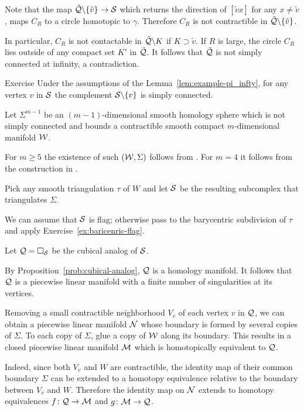 Note that the map $\tilde{\spc{Q}}\backslash \{\tilde v\}\to \spc{S}$
which returns the direction of $[{\tilde v}{x}]$  for any $x\ne \tilde v$, maps $C_R$ to a circle homotopic to $\gamma$.
Therefore $C_R$ is not contractible in $\tilde{\mathcal{Q}}\backslash \{\tilde v\}$.

In particular, 
$C_R$ is not contactable in $\tilde{\mathcal{Q}}\backslash K$
if $K\supset \tilde v$.
If $R$ is large, 
the circle $C_R$  
lies outside of any compact set $K'$ in $\tilde{\mathcal{Q}}$.
It follows that $\tilde{\mathcal{Q}}$ is not simply connected at infinity, a contradiction.
\qeds

\begin{thm}{Exercise}\label{ex:example-pi_infty-new}
Under the assumptions of the Lemma~\ref{lem:example-pi_infty}, 
for any vertex $v$ in $\mathcal{S}$
the complement $\mathcal{S}\backslash\{v\}$ is simply connected.
\end{thm}

Let $\Sigma^{m-1}$ be an $(m-1)$-dimensional smooth homology sphere which is not simply connected and bounds a contractible smooth compact $m$-dimensional manifold $\mathcal{W}$. 

For $m\ge 5$ the existence of such $(\mathcal{W}, \Sigma)$ follows from \cite{kervaire}. 
For $m=4$ it follows from the construction in \cite{mazur}.

Pick any smooth triangulation $\tau$ of $W$ and let $\mathcal{S}$ be the resulting subcomplex that triangulates $\Sigma$.


We can assume that $\mathcal{S}$ is flag; 
otherwise pass to the barycentric subdivision 
of $\tau$ and apply Exercise~\ref{ex:baricenric-flag}.


Let $\mathcal{Q}=\square_{\mathcal{S}}$ be the cubical analog of $\mathcal{S}$.

By Proposition~\ref{prob:cubical-analog},
$\mathcal{Q}$ is a homology manifold.
It follows that $\mathcal{Q}$ is a piecewise linear manifold 
with a finite number of singularities at its vertices.


Removing a small contractible neighborhood $V_v$ of each vertex $v$ in $\mathcal{Q}$,
we can obtain a piecewise linear manifold $\mathcal{N}$
whose boundary is formed by several copies of $\Sigma$.
To each copy of $\Sigma$, 
glue a copy of  $\mathcal{W}$ along its boundary.
This results in a  closed piecewise linear manifold 
$\mathcal{M}$ which is homotopically equivalent to $\mathcal{Q}$.

Indeed, since both $V_v$ and $W$ are contractible, the identity map of  their common boundary $\Sigma$ can be extended to a homotopy equivalence relative to the boundary between $V_v$ and $W$.
Therefore the identity map on $\mathcal{N}$ extends to homotopy equivalences 
$f\: \spc Q\to \spc M$ and $g\:\spc M\to \spc Q$.

